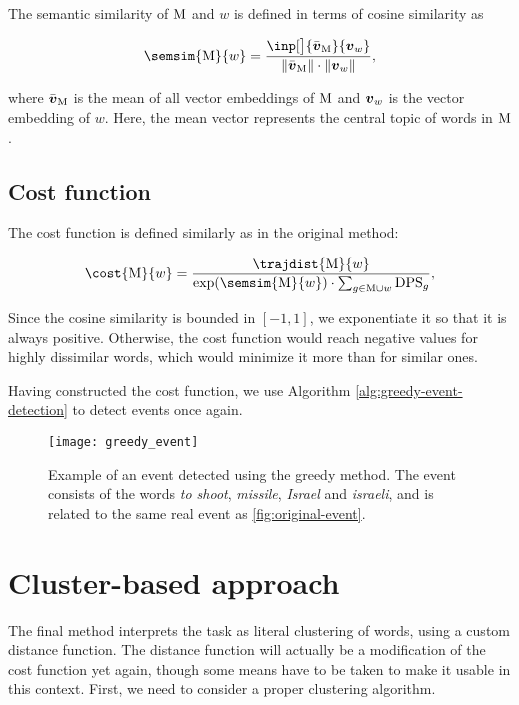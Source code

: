 The semantic similarity of $\text{M}$ and $w$ is defined in terms of cosine similarity as

\begin{equation}
	\semsim{\featset}{w} = \frac{\inp[\big]{\bar{\embed}_{\featset}}{\embed_{w}}}{\| \bar{\embed}_{\featset} \| \cdot \| \embed_{w} \|},
\end{equation}

where $\bar{\embed}_{\featset}$ is the mean of all vector embeddings of $\text{M}$ and $\embed_{w}$ is the vector embedding of $w$. Here, the mean vector represents the central topic of words in $\text{M}$.


\subsection{Cost function}
The cost function is defined similarly as in the original method:

\begin{equation} \label{eq:cost-function}
	\cost{\featset}{w} = \frac{\trajdist{\featset}{w}}{\exp(\semsim{\featset}{w}) \cdot \sum_{g \in \featset \cup w}{\text{DPS}_{g}}},
\end{equation}

Since the cosine similarity is bounded in $[-1, 1]$, we exponentiate it so that it is always positive. Otherwise, the cost function would reach negative values for highly dissimilar words, which would minimize it more than for similar ones.

Having constructed the cost function, we use Algorithm \ref{alg:greedy-event-detection} to detect events once again.


\begin{figure}[H]
  \centering
  \texttt{[image: greedy\_event]}  %
  \caption{Example of an event detected using the greedy method. The event consists of the words \textit{to shoot}, \textit{missile}, \textit{Israel} and \textit{israeli}, and is related to the same real event as \autoref{fig:original-event}.}
  \label{fig:greedy-event}
\end{figure}


\section{Cluster-based approach}
The final method interprets the task as literal clustering of words, using a custom distance function. The distance function will actually be a modification of the cost function yet again, though some means have to be taken to make it usable in this context. First, we need to consider a proper clustering algorithm.

